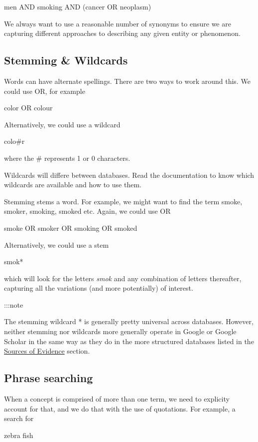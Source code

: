 \documentclass[
]{book}
\begin{document}
men AND smoking AND (cancer OR neoplasm)

We always want to use a reasonable number of synonyms to ensure we are capturing different approaches to describing any given entity or phenomenon.

\hypertarget{stemming-wildcards}{%
\subsection{Stemming \& Wildcards}\label{stemming-wildcards}}

Words can have alternate spellings. There are two ways to work around this. We could use OR, for example

color OR colour

Alternatively, we could use a wildcard

colo\#r

where the \# represents 1 or 0 characters.

Wildcards will differe between databases. Read the documentation to know which wildcards are available and how to use them.

Stemming stems a word. For example, we might want to find the term smoke, smoker, smoking, smoked etc. Again, we could use OR

smoke OR smoker OR smoking OR smoked

Alternatively, we could use a stem

smok*

which will look for the letters \emph{smok} and any combination of letters thereafter, capturing all the variations (and more potentially) of interest.

:::note

The stemming wildcard * is generally pretty universal across databases. However, neither stemming nor wildcards more generally operate in Google or Google Scholar in the same way as they do in the more structured databases listed in the \href{}{Sources of Evidence} section.

\hypertarget{phrase-searching}{%
\subsection{Phrase searching}\label{phrase-searching}}

When a concept is comprised of more than one term, we need to explicity account for that, and we do that with the use of quotations. For example, a search for

zebra fish
\end{document}

